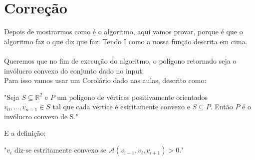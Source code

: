 \documentclass[11pt]{article}
\begin{document}
\section{Correção}
Depois de mostrarmos como é o algoritmo,
aqui vamos provar, porque é que o algoritmo faz o que diz que faz.
Tendo I como a nossa função descrita em cima.\\
\\
Queremos que no fim de execução do algoritmo, o poligono
retornado seja o invólucro convexo do conjunto dado 
no input.\\
Para isso vamos usar um Corolário dado nas aulas, descrito como:

\begin{center}
    "Seja $S \subseteq \mathbb{R}^2$ e $P$ um poligono de vértices 
    positivamente orientados $v_0,...,v_{n-1} \in S$ tal que cada
    vértice é estritamente convexo e $S \subseteq P$. Então $P$ é
    o invólucro convexo de S."
\end{center}
E a definição:

\begin{center}
    "$v_i$ diz-se estritamente convexo se $\mathcal{A}(v_{i-1},v_i,v_{i+1}) > 0$."
\end{center}
\end{document}
